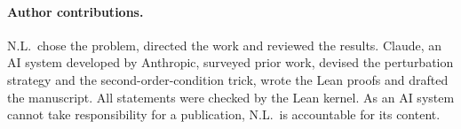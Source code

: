 \documentclass[11pt]{article}
\theoremstyle{remark}
\begin{document}
\paragraph{Author contributions.} N.L.\ chose the problem, directed the work and reviewed the
results. Claude, an AI system developed by Anthropic, surveyed prior work, devised the
perturbation strategy and the second-order-condition trick, wrote the Lean proofs and drafted the
manuscript. All statements were checked by the Lean kernel. As an AI system cannot take
responsibility for a publication, N.L.\ is accountable for its content.



\end{document}
